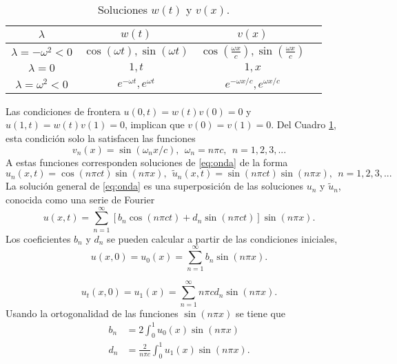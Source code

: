 \documentclass[11pt]{article}
\begin{document}
\begin{table}[h]
  \centering
  \begin{tabular}{|c|c|c|c} \hline
    $\lambda$ &  $w(t)$ & $v(x)$  \\ \hline
    $\lambda = -\omega^2 < 0$ & $\cos(\omega t), \sin(\omega t)$ & $\cos\left(\frac{\omega x}{c}\right), \sin\left(\frac{\omega x}{c}\right)$ \\ \hline
    $\lambda = 0$ & $1, t$ & $1, x$ \\ \hline
    $\lambda = \omega^2 < 0$ & $e^{-\omega t}, e^{\omega t}$ & $e^{-\omega x/c}, e^{\omega x/c}$ \\ \hline
  \end{tabular}
  \caption{Soluciones $w(t)$ y $v(x)$.}
  \label{tab:sol}
\end{table}
Las condiciones de frontera $u(0,t) = w(t)v(0) = 0$ y $u(1,t) = w(t)v(1)=0$, implican que $v(0)=v(1)=0$. Del Cuadro \ref{tab:sol}, esta condici\'on solo la satisfacen las funciones
\begin{equation}
  \label{eq:2}
v_n(x) = \sin(\omega_n x/c),~~\omega_n = n\pi c,~~n=1,2,3,...
\end{equation}
A estas funciones corresponden soluciones de \eqref{eq:onda} de la forma
\begin{equation}
  \label{eq:3}
  u_n(x,t) = \cos(n\pi c t)\sin(n\pi x),~~ \tilde{u}_n(x,t) = \sin(n\pi c t)\sin(n\pi x),~~n=1,2,3,...
\end{equation}
La soluci\'on general de \eqref{eq:onda} es una superposici\'on de las soluciones $u_n$ y $\tilde{u}_n$, conocida como una serie de Fourier
\begin{equation}
  \label{eq:5}
  u(x,t) = \sum_{n=1}^\infty \left[b_n\cos(n\pi c t) + d_n\sin(n\pi c t)\right] \sin(n\pi x).
\end{equation}
Los coeficientes $b_n$ y $d_n$ se pueden calcular a partir de las condiciones iniciales,
\begin{equation}
  \label{eq:7}
  u(x,0) = u_0(x) = \sum_{n=1}^\infty b_n\sin(n\pi x).
\end{equation}

\begin{equation}
  \label{eq:7}
  u_t(x,0) = u_1(x) = \sum_{n=1}^\infty n\pi c d_n \sin(n\pi x).
\end{equation}
Usando la ortogonalidad de las funciones $\sin(n\pi x)$ se tiene que
\begin{eqnarray}
  \label{eq:8}
  b_n &= 2 \displaystyle\int_0^1 u_0(x)\sin(n\pi x) \\
  d_n &= \displaystyle\frac{2}{n\pi c}\int_0^1 u_1(x)\sin(n\pi x).
\end{eqnarray}
\end{document}
